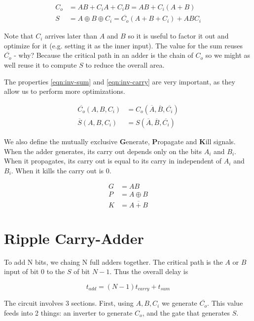 \documentclass[11pt]{report}
\begin{document}
\begin{align}
	\label{eqn:carry-out}
	C_o &= AB + C_iA+C_iB = AB + C_i(A+B)\\
	\label{eqn:sum}
	S &= A \oplus B \oplus C_i = \overline{C_o}(A + B + C_i) + ABC_i
\end{align}

Note that $C_i$ arrives later than $A$ and $B$ so it is useful to factor it out and optimize for it (e.g. setting it as the inner input). The value for the sum reuses $\overline{C_o}$ - why? Because the critical path in an adder is the chain of $C_o$ so we might as well reuse it to compute $S$ to reduce the overall area.

The properties \autoref{eqn:inv-sum} and \autoref{eqn:inv-carry} are very important, as they allow us to perform more optimizations.

\begin{align}
	\label{eqn:inv-carry}
	\overline{C_o}(A, B, C_i) &= C_o(\overline{A},\overline{B},\overline{C_i})\\
	\label{eqn:inv-sum}
	\overline{S}(A, B, C_i) &= S(\overline{A},\overline{B},\overline{C_i})
\end{align}

We also define the mutually exclusive \textbf{G}enerate, \textbf{P}ropagate and \textbf{K}ill signals. When the adder generates, its carry out depends only on the bits $A_i$ and $B_i$. When it propagates, its carry out is equal to its carry in independent of $A_i$ and $B_i$. When it kills the carry out is 0.

\begin{align}
	G &= AB \\
	P &= A \oplus B\\
	K &= \overline{A + B}
\end{align}

\section{Ripple Carry-Adder}
To add N bits, we chaing N full adders together. The critical path is the $A$ or $B$ input of bit 0 to the $S$ of bit $N-1$. Thus the overall delay is

\begin{equation}
	\label{eqn:rca-delay}
	t_{add} = (N-1)t_{carry} + t_{sum}
\end{equation}

The circuit involves 3 sections. First, using $A, B, C_i$ we generate $\overline{C_o}$. This value feeds into 2 things: an inverter to generate $C_o$, and the gate that generates $S$.
\end{document}
